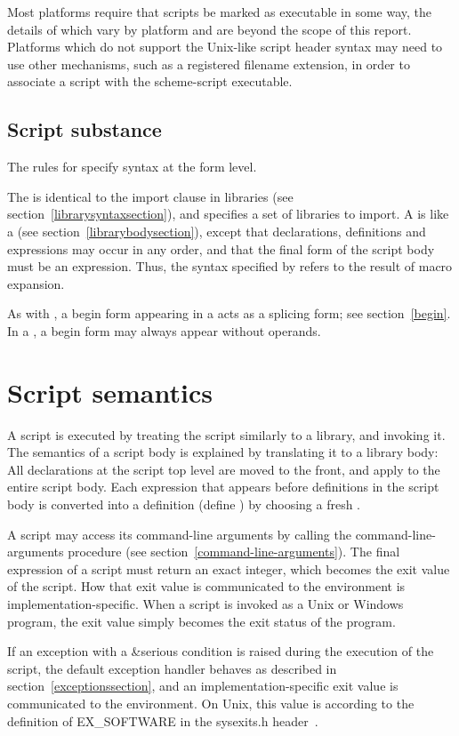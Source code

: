 Most platforms require that scripts be marked as executable in some way, 
the details of which vary by platform and are beyond the scope of this 
report. Platforms which do not support the Unix-like script header syntax 
may need to use other mechanisms, such as a registered filename extension, 
in order to associate a script with the {\cf scheme-script} executable.

\subsection{Script substance}

The rules for  specify syntax at the form level.

The  is identical to the import clause in
libraries (see section~\ref{librarysyntaxsection}), 
and specifies a set of libraries to import.  A  is like a  (see
section~\ref{librarybodysection}), except that declarations,
definitions and expressions may occur in any order, and that the final
form of the script body must be an expression.  Thus, the syntax
specified by  refers to the result of macro
expansion.

As with , a {\cf begin} form appearing in a
 acts as a splicing form; see section~\ref{begin}.
In a , a {\cf begin} form may always appear without
operands.

\section{Script semantics}

A script is executed by treating the script similarly to a library, and
invoking it.  The semantics of a script body is explained by
translating it to a library body: All declarations at the script top
level are moved to the front, and apply to the entire script body.
Each expression  that appears before definitions in
the script body is converted into a definition {\cf (define 
  )} by choosing a fresh .

A script may access its command-line arguments by calling the {\cf
  command-line-arguments} procedure (see
section~\ref{command-line-arguments}).  The final expression of a
script must return an exact integer, which becomes the exit value of
the script.  How that exit value is communicated to the environment is
implementation-specific.  When a script is invoked as a Unix or
Windows program, the exit value simply becomes the exit status of the
program.

If an exception with a {\cf\&serious} condition is raised during the
execution of the script, the default exception handler behaves as
described in section~\ref{exceptionssection}, and an
implementation-specific exit value is communicated to the
environment.  On Unix, this value is according to the definition of
{\cf EX\_SOFTWARE} in the {\cf sysexits.h} header~\cite{srfi22}.

